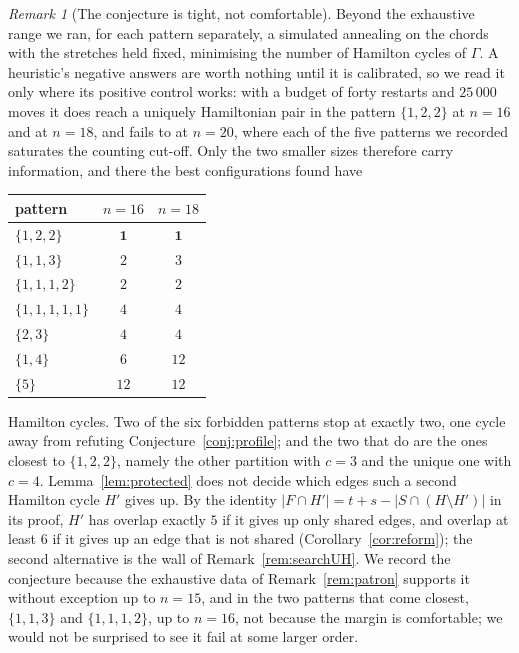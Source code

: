 \documentclass[11pt,a4paper]{article}
\theoremstyle{definition}
\theoremstyle{remark}
\newtheorem{remark}[theorem]{Remark}
\begin{document}
\begin{remark}[The conjecture is tight, not comfortable]\label{rem:tight}
Beyond the exhaustive range we ran, for each pattern separately, a simulated annealing on the chords with the stretches held fixed, minimising the number of Hamilton cycles of $\Gamma$. A heuristic's negative answers are worth nothing until it is calibrated, so we read it only where its positive control works: with a budget of forty restarts and $25\,000$ moves it does reach a uniquely Hamiltonian pair in the pattern $\{1,2,2\}$ at $n=16$ and at $n=18$, and fails to at $n=20$, where each of the five patterns we recorded saturates the counting cut-off. Only the two smaller sizes therefore carry information, and there the best configurations found have
\begin{center}
\begin{tabular}{lcc}
\toprule
pattern & $n=16$ & $n=18$\\
\midrule
$\{1,2,2\}$      & $\mathbf{1}$ & $\mathbf{1}$\\
$\{1,1,3\}$      & $2$  & $3$ \\
$\{1,1,1,2\}$    & $2$  & $2$ \\
$\{1,1,1,1,1\}$  & $4$  & $4$ \\
$\{2,3\}$        & $4$  & $4$ \\
$\{1,4\}$        & $6$  & $12$\\
$\{5\}$          & $12$ & $12$\\
\bottomrule
\end{tabular}
\end{center}
Hamilton cycles. Two of the six forbidden patterns stop at exactly two, one cycle away from refuting Conjecture~\ref{conj:profile}; and the two that do are the ones closest to $\{1,2,2\}$, namely the other partition with $c=3$ and the unique one with $c=4$. Lemma~\ref{lem:protected} does not decide which edges such a second Hamilton cycle $H'$ gives up. By the identity $|F\cap H'|=t+s-|S\cap(H\setminus H')|$ in its proof, $H'$ has overlap exactly $5$ if it gives up only shared edges, and overlap at least $6$ if it gives up an edge that is not shared (Corollary~\ref{cor:reform}); the second alternative is the wall of Remark~\ref{rem:searchUH}. We record the conjecture because the exhaustive data of Remark~\ref{rem:patron} supports it without exception up to $n=15$, and in the two patterns that come closest, $\{1,1,3\}$ and $\{1,1,1,2\}$, up to $n=16$, not because the margin is comfortable; we would not be surprised to see it fail at some larger order.
\end{remark}
\end{document}
